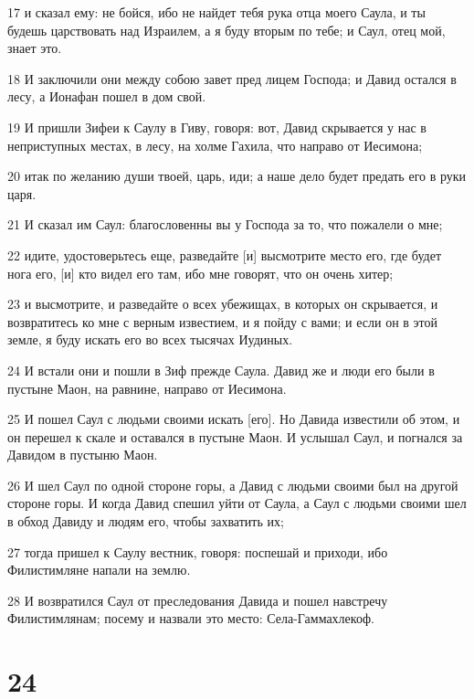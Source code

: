 \par 17 и сказал ему: не бойся, ибо не найдет тебя рука отца моего Саула, и ты будешь царствовать над Израилем, а я буду вторым по тебе; и Саул, отец мой, знает это.
\par 18 И заключили они между собою завет пред лицем Господа; и Давид остался в лесу, а Ионафан пошел в дом свой.
\par 19 И пришли Зифеи к Саулу в Гиву, говоря: вот, Давид скрывается у нас в неприступных местах, в лесу, на холме Гахила, что направо от Иесимона;
\par 20 итак по желанию души твоей, царь, иди; а наше дело будет предать его в руки царя.
\par 21 И сказал им Саул: благословенны вы у Господа за то, что пожалели о мне;
\par 22 идите, удостоверьтесь еще, разведайте [и] высмотрите место его, где будет нога его, [и] кто видел его там, ибо мне говорят, что он очень хитер;
\par 23 и высмотрите, и разведайте о всех убежищах, в которых он скрывается, и возвратитесь ко мне с верным известием, и я пойду с вами; и если он в этой земле, я буду искать его во всех тысячах Иудиных.
\par 24 И встали они и пошли в Зиф прежде Саула. Давид же и люди его были в пустыне Маон, на равнине, направо от Иесимона.
\par 25 И пошел Саул с людьми своими искать [его]. Но Давида известили об этом, и он перешел к скале и оставался в пустыне Маон. И услышал Саул, и погнался за Давидом в пустыню Маон.
\par 26 И шел Саул по одной стороне горы, а Давид с людьми своими был на другой стороне горы. И когда Давид спешил уйти от Саула, а Саул с людьми своими шел в обход Давиду и людям его, чтобы захватить их;
\par 27 тогда пришел к Саулу вестник, говоря: поспешай и приходи, ибо Филистимляне напали на землю.
\par 28 И возвратился Саул от преследования Давида и пошел навстречу Филистимлянам; посему и назвали это место: Села-Гаммахлекоф.

\chapter{24}


